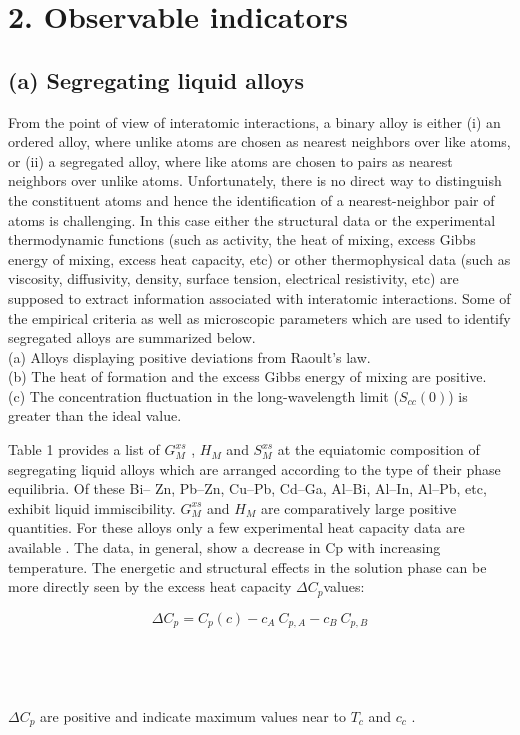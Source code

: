 \documentclass[12pt]{article}
\newcommand*{\1}{\hspace{1pt}}
\begin{document}
\section*{2. Observable indicators}


\subsection*{(a) Segregating liquid alloys}

    From the point of view of interatomic interactions, a binary alloy is either (i) an ordered
alloy, where unlike atoms are chosen as nearest neighbors over like atoms, or (ii) a
segregated alloy, where like atoms are chosen to pairs as nearest neighbors over unlike
atoms. Unfortunately, there is no direct way to distinguish the constituent atoms and
hence the identification of a nearest-neighbor pair of atoms is challenging. In this case
either the structural data or the experimental thermodynamic functions (such as activity, the heat of
mixing, excess Gibbs energy of mixing, excess heat capacity, etc) or other thermophysical
data (such as viscosity, diffusivity, density, surface tension, electrical resistivity, etc) are
supposed to extract information associated with interatomic interactions. Some of the
empirical criteria as well as microscopic parameters which are used to identify segregated
alloys are summarized below.\\
(a) Alloys displaying positive deviations from Raoult’s law.\\
(b) The heat of formation and the excess Gibbs energy of mixing are positive.\\
(c) The concentration fluctuation in the long-wavelength limit ($ S _{cc}(0) $) is greater than
    the ideal value.


    Table 1 provides a list of $G^{xs} _{M}$ , $H _M$ and $S^{xs} _{M}$ at the equiatomic composition 
of segregating liquid alloys which are arranged according to the type of their phase equilibria. Of these Bi–
Zn, Pb–Zn, Cu–Pb, Cd–Ga, Al–Bi, Al–In, Al–Pb, etc, exhibit liquid immiscibility. $G^{xs} _{M}$ and
$ H _M $ are comparatively large positive quantities. For these alloys only a few experimental
heat capacity data are available . The data, in general, show a decrease in Cp with increasing temperature. The energetic and structural effects in the
solution phase can be more directly seen by the excess heat capacity $\Delta  C _p $values:

    \begin{equation}
        \Delta  C _p = C_p(c) - c_A \ C_{p,A} - c_B \ C_{p,B} 
    \end{equation}
    \\
    \\
    \\
    \\
$\Delta  C _p $ are positive and indicate maximum values near to $ T _c$ and $c _c$ . \\
\end{document}
